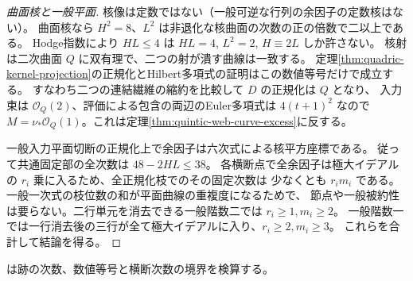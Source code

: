 \begin{proof}[曲面核と一般平面]
核像は定数ではない（一般可逆な行列の余因子の定数核はない）。
曲面核なら $H^2=8$、$L^2$ は非退化な核曲面の次数の正の倍数で二以上である。
Hodge指数により $HL\le4$ は $HL=4$, $L^2=2$, $H\equiv2L$ しか許さない。
核射は二次曲面 $Q$ に双有理で、二つの射が潰す曲線は一致する。
定理\ref{thm:quadric-kernel-projection}の正規化とHilbert多項式の証明はこの数値等号だけで成立する。
すなわち二つの連結繊維の縮約を比較して $D$ の正規化は $Q$ となり、
入力束は $\mathcal O_Q(2)$、評価による包含の両辺のEuler多項式は $4(t+1)^2$ なので
$M=\nu_*\mathcal O_Q(1)$。これは定理\ref{thm:quintic-web-curve-excess}に反する。

一般入力平面切断の正規化上で余因子は六次式による核平方座標である。
従って共通固定部の全次数は $48-2HL\le38$。
各横断点で全余因子は極大イデアルの $r_i$ 乗に入るため、全正規化枝でのその固定次数は
少なくとも $r_i m_i$ である。一般一次式の枝位数の和が平面曲線の重複度になるためで、
節点や一般被約性は要らない。二行単元を消去できる一般階数二では $r_i\ge1,m_i\ge2$。
一般階数一では一行消去後の三行が全て極大イデアルに入り、$r_i\ge2,m_i\ge3$。
これらを合計して結論を得る。
\end{proof}
 は跡の次数、数値等号と横断次数の境界を検算する。
